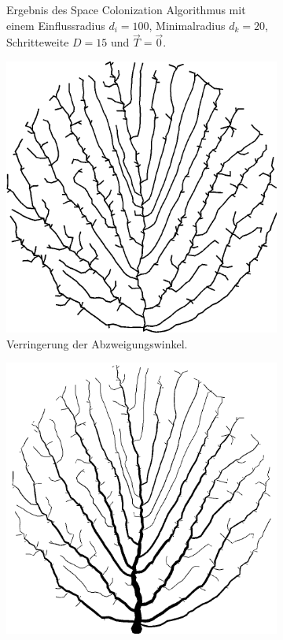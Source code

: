 \begin{figure} [htbp]
\begin{subfigure}[t]{.4\textwidth}
		\caption{Ergebnis des Space Colonization Algorithmus mit einem Einflussradius $d_i = 100$, Minimalradius $d_k = 20$, Schritteweite $D = 15$ und $\overrightarrow{T} = \overrightarrow{0}$.}
		\label{subfig:SCA_Extended2}
	\end{subfigure}
	\begin{subfigure}[t]{.4\textwidth}
		\centering
		\includegraphics[width=\linewidth]{images/SCA_Extended3.png}
		\caption{Verringerung der Abzweigungswinkel.}
		\label{subfig:SCA_Extended3}
	\end{subfigure}
	\hspace{.1\textwidth}
	\begin{subfigure}[t]{.4\textwidth}
		\centering
		\includegraphics[width=\linewidth]{images/SCA_Extended4.png}

\end{subfigure}
\end{figure}
